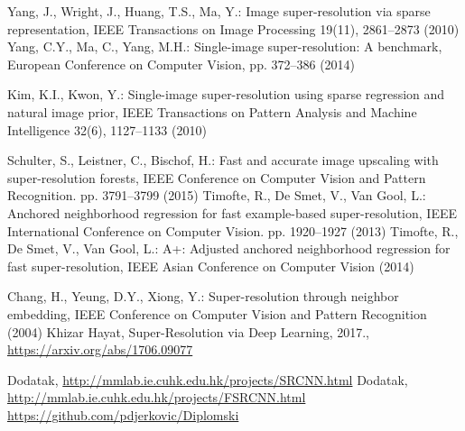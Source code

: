 \documentclass[12pt]{report}
\numberwithin{equation}{section}
\begin{document}
\begin{thebibliography}{10}
 Yang, J., Wright, J., Huang, T.S., Ma, Y.: Image super-resolution via sparse representation, IEEE Transactions on Image Processing 19(11), 2861–2873 (2010)
 Yang, C.Y., Ma, C., Yang, M.H.: Single-image super-resolution: A benchmark, European Conference on Computer Vision, pp. 372–386 (2014)

 Kim, K.I., Kwon, Y.: Single-image super-resolution using sparse regression and natural image prior, IEEE Transactions on Pattern Analysis and Machine Intelligence 32(6), 1127–1133 (2010)

 Schulter, S., Leistner, C., Bischof, H.: Fast and accurate image upscaling with super-resolution forests, IEEE Conference on Computer Vision and Pattern Recognition. pp. 3791–3799 (2015)
 Timofte, R., De Smet, V., Van Gool, L.: Anchored neighborhood regression for fast example-based super-resolution, IEEE International Conference on Computer Vision. pp. 1920–1927 (2013)
 Timofte, R., De Smet, V., Van Gool, L.: A+: Adjusted anchored neighborhood regression for fast super-resolution, IEEE Asian Conference on Computer Vision (2014)

 Chang, H., Yeung, D.Y., Xiong, Y.: Super-resolution through neighbor embedding, IEEE Conference on Computer Vision and Pattern Recognition (2004)
 Khizar Hayat, Super-Resolution via Deep Learning, 2017., \url{https://arxiv.org/abs/1706.09077}

 Dodatak, \url{http://mmlab.ie.cuhk.edu.hk/projects/SRCNN.html}
 Dodatak, \url{http://mmlab.ie.cuhk.edu.hk/projects/FSRCNN.html}
 \url{https://github.com/pdjerkovic/Diplomski}






\end{thebibliography}
\end{document}
